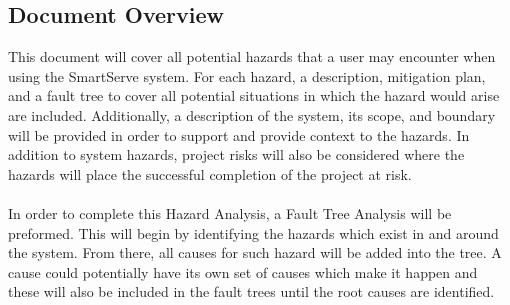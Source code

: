 \documentclass[11pt]{article}
\begin{document}
\subsection{Document Overview}
This document will cover all potential hazards that a user may encounter when using the SmartServe system. For each hazard, a description, mitigation plan, and a fault tree to cover all potential situations in which the hazard would arise are included. Additionally, a description of the system, its scope, and boundary will be provided in order to support and provide context to the hazards. In addition to system hazards, project risks will also be considered where the hazards will place the successful completion of the project at risk. \\ \\
In order to complete this Hazard Analysis, a Fault Tree Analysis will be preformed. This will begin by identifying the hazards which exist in and around the system. From there, all causes for such hazard will be added into the tree. A cause could potentially have its own set of causes which make it happen and these will also be included in the fault trees until the root causes are identified.
\end{document}
